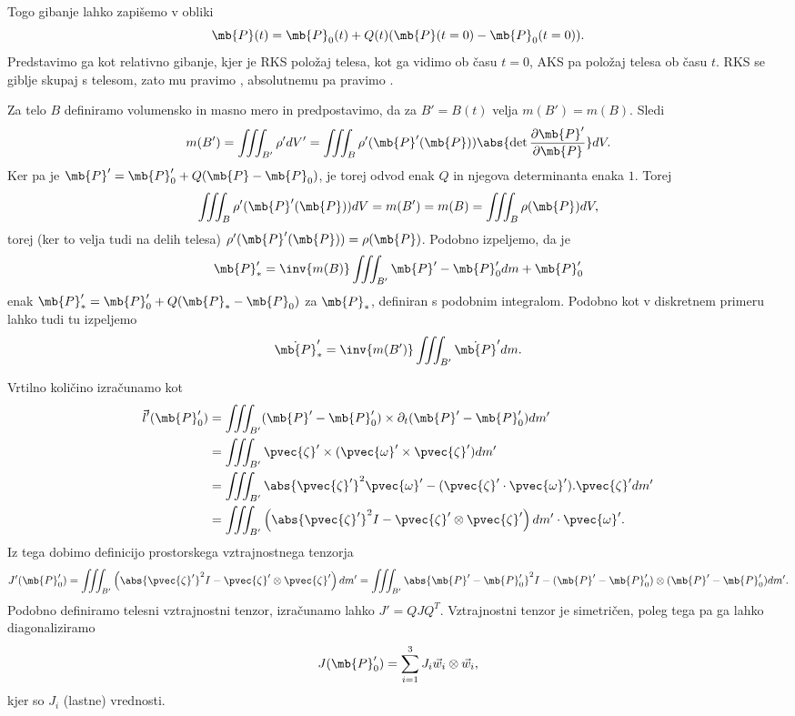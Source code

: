 Togo gibanje lahko zapišemo v obliki
\[
  \mb{P}(t) = \mb{P}_0(t) + Q(t) (\mb{P}(t=0) -\mb{P}_0(t=0)).
\]
Predstavimo ga kot relativno gibanje, kjer je RKS položaj telesa, kot ga vidimo
ob času $t=0$, AKS pa položaj telesa ob času $t$.
RKS se giblje skupaj s telesom, zato mu pravimo , absolutnemu
pa pravimo .


Za telo $B$ definiramo volumensko in masno mero in predpostavimo, da za $B' =
B(t)$ velja $m(B') = m(B)$.
Sledi
\[
  m(B') = \iiint_{B'} \rho' dV'
  = \iiint_{B} \rho'(\mb{P}'(\mb{P})) \abs{\det \frac{\partial
	  \mb{P}'}{\partial \mb{P}}} dV.
\]
Ker pa je $\mb{P}' = \mb{P}_0' + Q(\mb{P} - \mb{P}_0)$, je torej odvod enak $Q$
in njegova determinanta enaka $1$.
Torej
\[
  \iiint_{B} \rho'(\mb{P}'(\mb{P})) dV
  = m(B')
  = m(B)
  = \iiint_B \rho(\mb{P}) dV,
\]
torej (ker to velja tudi na delih telesa) $\rho'(\mb{P}'(\mb{P})) =
\rho(\mb{P})$.
Podobno izpeljemo, da je
\[
  \mb{P}_*' = \inv{m(B)} \iiint_{B'} \mb{P}' - \mb{P}_0' dm + \mb{P}_0'
\]
enak $\mb{P}_*' = \mb{P}_0' + Q(\mb{P}_* - \mb{P}_0)$ za $\mb{P}_*$, definiran s
podobnim integralom.
Podobno kot v diskretnem primeru lahko tudi tu izpeljemo
\[
  \dot{\mb{P}}_*' = \inv{m(B')} \iiint_{B'} \dot{\mb{P}}' dm.
\]

Vrtilno količino izračunamo kot
\begin{align*}
  \vec{l}'(\mb{P}_0')
  &= \iiint_{B'} (\mb{P}' - \mb{P}_0') \times \partial_t (\mb{P}' - \mb{P}_0') dm' \\
  &= \iiint_{B'} \pvec{\zeta}' \times (\pvec{\omega}' \times \pvec{\zeta}') dm' \\
  &= \iiint_{B'} \abs{\pvec{\zeta}'}^2 \pvec{\omega}' - (\pvec{\zeta}' \cdot \pvec{\omega}') . \pvec{\zeta}' dm' \\
  &= \iiint_{B'} \left(\abs{\pvec{\zeta}'}^2 I - \pvec{\zeta}' \otimes \pvec{\zeta}'\right) dm' \cdot \pvec{\omega}'.
\end{align*}
Iz tega dobimo definicijo prostorskega vztrajnostnega tenzorja
\[
  J'(\mb{P}_0') = \iiint_{B'} \left(\abs{\pvec{\zeta}'}^2 I - \pvec{\zeta}'
	\otimes \pvec{\zeta}'\right) dm'
  = \iiint_{B'} \abs{\mb{P}' - \mb{P}_0'}^2 I - (\mb{P}' - \mb{P}_0') \otimes
  (\mb{P}' - \mb{P}_0') dm'.
\]
Podobno definiramo telesni vztrajnostni tenzor, izračunamo lahko $J' = Q J Q^T$.
Vztrajnostni tenzor je simetričen, poleg tega pa ga lahko diagonaliziramo
\[
  J(\mb{P}_0') = \sum_{i=1}^3 J_i \vec{w}_i \otimes \vec{w}_i,
\]
kjer so $J_i$  (lastne) vrednosti.

